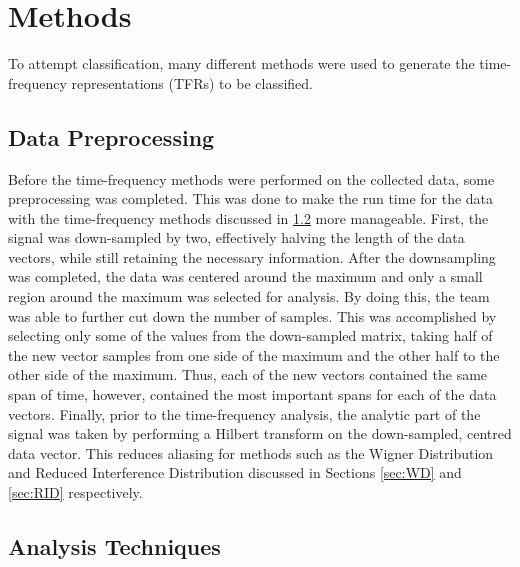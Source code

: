 \documentclass{article}[11pt]
\begin{document}
\section{Methods}
\label{sec:methods}
To attempt classification, many different methods were used to generate the time-frequency representations (TFRs) to be classified.
\subsection{Data Preprocessing}
Before the time-frequency methods were performed on the collected data, some preprocessing was completed. This was done to make the run time for the data with the time-frequency methods discussed in \ref{sec:analysis} more manageable. First, the signal was down-sampled by two, effectively halving the length of the data vectors, while still retaining the necessary information. After the downsampling was completed, the data was centered around the maximum and only a small region around the maximum was selected for analysis. By doing this, the team was able to further cut down the number of samples. This was accomplished by selecting only some of the values from the down-sampled matrix, taking half of the new vector samples from one side of the maximum and the other half to the other side of the maximum. Thus, each of the new vectors contained the same span of time, however, contained the most important spans for each of the data vectors. Finally, prior to the time-frequency analysis, the analytic part of the signal was taken by performing a Hilbert transform on the down-sampled, centred data vector. This reduces aliasing for methods such as the Wigner Distribution and Reduced Interference Distribution discussed in Sections \ref{sec:WD} and \ref{sec:RID} respectively.
\subsection{Analysis Techniques}
\label{sec:analysis}
\end{document}
